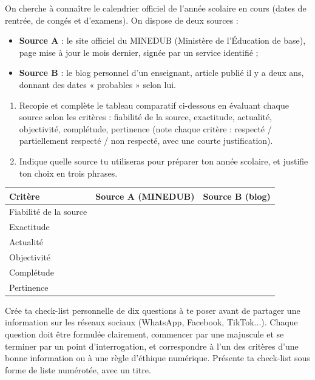\documentclass[11pt]{article}
\begin{document}
\begin{exercice}
On cherche à connaître le calendrier officiel de l'année scolaire en cours (dates de rentrée, de congés et d'examens). On dispose de deux sources :
\begin{itemize}
\item \textbf{Source A} : le site officiel du MINEDUB (Ministère de l'Éducation de base), page mise à jour le mois dernier, signée par un service identifié ;
\item \textbf{Source B} : le blog personnel d'un enseignant, article publié il y a deux ans, donnant des dates « probables » selon lui.
\end{itemize}
\begin{enumerate}
\item Recopie et complète le tableau comparatif ci-dessous en évaluant chaque source selon les critères : fiabilité de la source, exactitude, actualité, objectivité, complétude, pertinence (note chaque critère : respecté / partiellement respecté / non respecté, avec une courte justification).
\item Indique quelle source tu utiliseras pour préparer ton année scolaire, et justifie ton choix en trois phrases.
\end{enumerate}

\begin{center}
\begin{tabularx}{\linewidth}{|l|X|X|}
\hline
\rowcolor{popblueL} \textbf{Critère} & \textbf{Source A (MINEDUB)} & \textbf{Source B (blog)} \\
\hline
Fiabilité de la source & & \\
\hline
Exactitude & & \\
\hline
Actualité & & \\
\hline
Objectivité & & \\
\hline
Complétude & & \\
\hline
Pertinence & & \\
\hline
\end{tabularx}
\end{center}
\end{exercice}

\begin{exercice}
Crée ta check-list personnelle de dix questions à te poser avant de partager une information sur les réseaux sociaux (WhatsApp, Facebook, TikTok...). Chaque question doit être formulée clairement, commencer par une majuscule et se terminer par un point d'interrogation, et correspondre à l'un des critères d'une bonne information ou à une règle d'éthique numérique. Présente ta check-list sous forme de liste numérotée, avec un titre.
\end{exercice}
\end{document}
